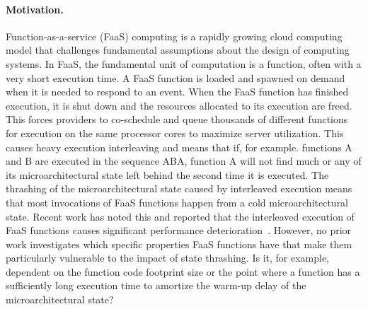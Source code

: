 \documentclass[../main.tex]{subfiles}
\begin{document}
\begin{refsection}
\paragraph{Motivation.} Function-as-a-service (FaaS) computing is a
rapidly growing cloud computing model that challenges fundamental
assumptions about the design of computing systems. In FaaS, the
fundamental unit of computation is a function, often with a very short
execution time. A FaaS function is loaded and spawned on demand when
it is needed to respond to an event. When the FaaS function has
finished execution, it is shut down and the resources allocated to its
execution are freed. This forces providers to co-schedule and queue
thousands of different functions for execution on the same processor
cores to maximize server utilization. This causes heavy execution
interleaving and means that if, for example. functions A and B are
executed in the sequence ABA, function A will not find much or any of
its microarchitectural state left behind the second time it is
executed. The thrashing of the microarchitectural state caused by
interleaved execution means that most invocations of FaaS functions
happen from a cold microarchitectural state. Recent work has noted
this and reported that the interleaved execution of FaaS functions
causes significant performance
deterioration~\cite{shahrad19_archit_implic_funct_servic_comput,lukewarm_serverless}. However,
no prior work investigates which specific properties FaaS functions
have that make them particularly vulnerable to the impact of state
thrashing. Is it, for example, dependent on the function code footprint size or the point where a function has a sufficiently long execution time to amortize the warm-up delay of the microarchitectural state?


\end{refsection}
\end{document}
